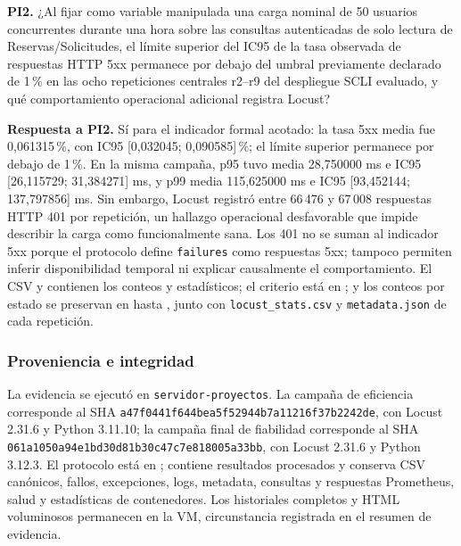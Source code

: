 \textbf{PI2.} ¿Al fijar como variable manipulada una carga nominal de 50
usuarios concurrentes durante una hora sobre las consultas autenticadas de
solo lectura de Reservas/Solicitudes, el límite superior del IC95 de la tasa
observada de respuestas HTTP 5xx permanece por debajo del umbral previamente
declarado de 1\,\% en las ocho repeticiones centrales r2--r9 del despliegue
SCLI evaluado, y qué comportamiento operacional adicional registra Locust?

\textbf{Respuesta a PI2.} Sí para el indicador formal acotado: la tasa 5xx
media fue 0,061315\,\%, con IC95 [0,032045; 0,090585]\,\%; el límite superior
permanece por debajo de 1\,\%. En la misma campaña, p95 tuvo media 28,750000 ms
e IC95 [26,115729; 31,384271] ms, y p99 media 115,625000 ms e IC95
[93,452144; 137,797856] ms. Sin embargo, Locust registró entre 66\,476 y
67\,008 respuestas HTTP 401 por repetición, un hallazgo operacional
desfavorable que impide describir la carga como funcionalmente sana. Los 401
no se suman al indicador 5xx porque el protocolo define \texttt{failures} como
respuestas 5xx; tampoco permiten inferir disponibilidad temporal ni explicar
causalmente el comportamiento. El CSV y
 contienen los
conteos y estadísticos; el criterio está en
; y los conteos por estado se
preservan en
hasta , junto con
\texttt{locust\_stats.csv} y \texttt{metadata.json} de cada repetición.

\subsubsection{Proveniencia e integridad}

La evidencia se ejecutó en \texttt{servidor-proyectos}. La campaña de
eficiencia corresponde al SHA
\texttt{a47f0441f644bea5f52944b7a11216f37b2242de}, con Locust 2.31.6 y Python
3.11.10; la campaña final de fiabilidad corresponde al SHA
\texttt{061a1050a94e1bd30d81b30c47c7e818005a33bb}, con Locust 2.31.6 y Python
3.12.3. El protocolo está en
;
 contiene resultados
procesados y  conserva CSV canónicos,
fallos, excepciones, logs, metadata,
consultas y respuestas Prometheus, salud y estadísticas de contenedores. Los
historiales completos y HTML voluminosos permanecen en la VM, circunstancia
registrada en el resumen de evidencia.

